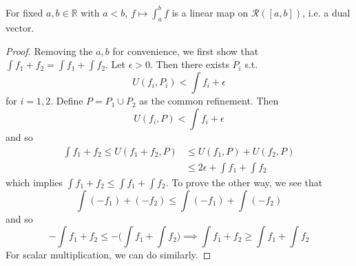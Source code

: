   \begin{theorem}
    For fixed $a, b \in \mathbb{R}$ with $a < b$, $f \mapsto \int_a^b f$ is a linear map on $\mathcal{R}([a, b])$, i.e. a dual vector. 
  \end{theorem}
  \begin{proof}
    Removing the $a, b$ for convenience, we first show that $\int f_1 + f_2 = \int f_1 + \int f_2$. Let $\epsilon > 0$. Then there exists $P_i$ s.t. 
    \begin{equation}
      U(f_i, P_i) < \int f_i + \epsilon
    \end{equation}
    for $i = 1, 2$. Define $P = P_1 \cup P_2$ as the common refinement. Then 
    \begin{equation}
      U(f_i, P) < \int f_i + \epsilon
    \end{equation} 
    and so 
    \begin{align}
      \int f_1 + f_2 \leq U(f_1 + f_2, P) & \leq U(f_1, P) + U(f_2, P) \\ 
                                          & \leq 2 \epsilon + \int f_1 + \int f_2
    \end{align}
    which implies $\int f_1 + f_2 \leq \int f_1 + \int f_2$. To prove the other way, we see that 
    \begin{equation}
      \int (-f_1) + (-f_2) \leq \int (-f_1) + \int (-f_2) 
    \end{equation}
    and so 
    \begin{equation}
      - \int f_1 + f_2 \leq - \bigg( \int f_1 + \int f_2 \bigg) \implies \int f_1 + f_2 \geq \int f_1 + \int f_2
    \end{equation}
    For scalar multiplication, we can do similarly. 
  \end{proof} 

